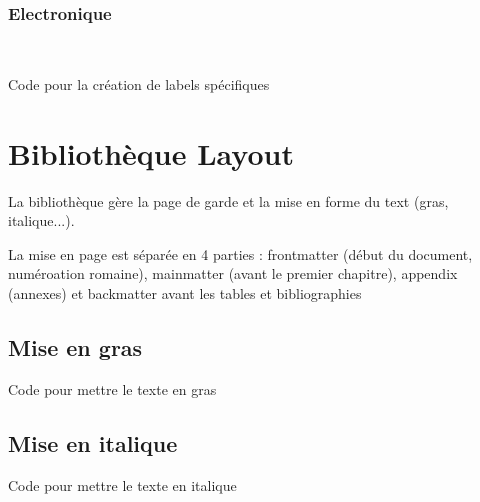 {\subsection{Electronique}

\\



\begin{Latex}{Code pour la création de labels spécifiques}



\end{Latex}


\chapter{Bibliothèque Layout}

La bibliothèque  gère la page de garde et la mise en forme du text (gras, italique...).

La mise en page est séparée en 4 parties : frontmatter (début du document, numéroation romaine), mainmatter (avant le premier chapitre), appendix (annexes) et backmatter avant les tables et bibliographies

\section{Mise en gras}

\sn

\begin{Latex}{Code pour mettre le texte en gras}
\end{Latex}

\section{Mise en italique}

\sn
{}
\begin{Latex}{Code pour mettre le texte en italique}
\end{Latex}

}
